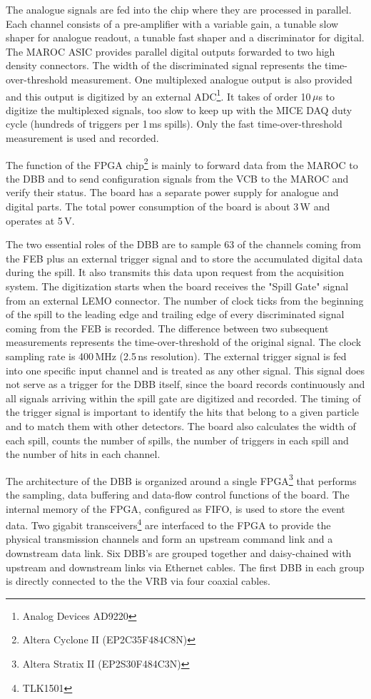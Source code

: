 \documentclass[a4paper,11pt]{article}
\begin{document}
The analogue signals are fed into the chip where they are processed in parallel. Each channel consists of a pre-amplifier with a variable gain,
a tunable slow shaper for analogue readout, a tunable fast shaper and a discriminator for digital.
The MAROC ASIC provides parallel digital outputs forwarded to two high density connectors. The width of the
discriminated signal represents the time-over-threshold measurement. One multiplexed analogue output is also provided and this output is digitized by
an external ADC\footnote{Analog Devices AD9220}. It takes of order 10\,$\mu$s to digitize the multiplexed signals,
too slow to keep up with the MICE DAQ duty cycle (hundreds of triggers per 1\,ms spills). Only the fast time-over-threshold
measurement is used and recorded.

The function of the FPGA chip\footnote{Altera Cyclone II (EP2C35F484C8N)} is mainly to forward data from the MAROC to the DBB and to send configuration
signals from the VCB to the MAROC and verify their status. The board has a separate power supply for analogue and digital parts. The total
power consumption of the board is about 3\,W and operates at 5\,V.

The two essential roles of the DBB are to sample 63 of the channels coming from the FEB plus an external trigger signal and to store the accumulated
digital data during the spill. It also transmits this data upon request from the acquisition system. The digitization starts when the board
receives the "Spill Gate" signal from an external LEMO connector. The number of clock ticks from the beginning of the spill to the leading edge
and trailing edge of every discriminated signal coming from the FEB is recorded. The difference between two subsequent measurements represents the time-over-threshold of the original signal. 
The clock sampling rate is 400\,MHz (2.5\,ns resolution). The external trigger signal is fed into one specific
input channel and is treated as any other signal. This signal does not serve as a trigger for the DBB itself, since the board records continuously
and all signals arriving within the spill gate are digitized and recorded. The timing of the trigger signal is important
to identify the hits that belong to a given particle and to match them with other detectors. The board also
calculates the width of each spill, counts the number of spills, the number of triggers in each spill and the number of hits in each channel.

The architecture of the DBB is organized around a single FPGA\footnote{Altera Stratix II (EP2S30F484C3N)} that performs the sampling, data
buffering and data-flow control functions of the board. The internal memory of the FPGA, configured as FIFO, is used to store the event data. Two gigabit transceivers\footnote{TLK1501}
are interfaced to the FPGA to provide the physical transmission channels and form an upstream command link and a downstream data link. Six DBB's are
grouped together and daisy-chained with upstream and downstream links via Ethernet cables. The first DBB in each group is directly connected to the
the VRB via four coaxial cables.
\end{document}

